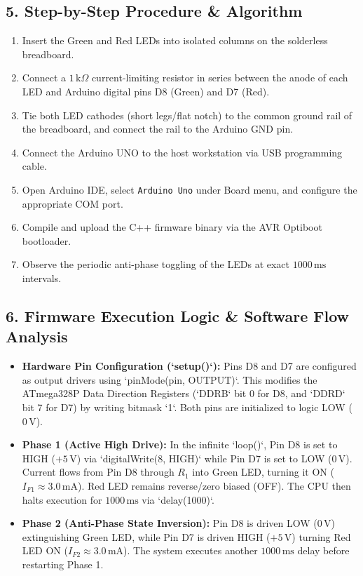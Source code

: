 \documentclass[11pt,a4paper]{article}
\begin{document}
\subsection*{5. Step-by-Step Procedure \& Algorithm}
\begin{enumerate}[noitemsep]
    \item Insert the Green and Red LEDs into isolated columns on the solderless breadboard.
    \item Connect a $1\,\text{k}\Omega$ current-limiting resistor in series between the anode of each LED and Arduino digital pins D8 (Green) and D7 (Red).
    \item Tie both LED cathodes (short legs/flat notch) to the common ground rail of the breadboard, and connect the rail to the Arduino GND pin.
    \item Connect the Arduino UNO to the host workstation via USB programming cable.
    \item Open Arduino IDE, select \texttt{Arduino Uno} under Board menu, and configure the appropriate COM port.
    \item Compile and upload the C++ firmware binary via the AVR Optiboot bootloader.
    \item Observe the periodic anti-phase toggling of the LEDs at exact $1000\,\text{ms}$ intervals.
\end{enumerate}

\subsection*{6. Firmware Execution Logic \& Software Flow Analysis}
\begin{itemize}[leftmargin=*]
    \item \textbf{Hardware Pin Configuration (`setup()`):} Pins D8 and D7 are configured as output drivers using `pinMode(pin, OUTPUT)`. This modifies the ATmega328P Data Direction Registers (`DDRB` bit 0 for D8, and `DDRD` bit 7 for D7) by writing bitmask `1`. Both pins are initialized to logic LOW ($0\,\text{V}$).
    \item \textbf{Phase 1 (Active High Drive):} In the infinite `loop()`, Pin D8 is set to HIGH ($+5\,\text{V}$) via `digitalWrite(8, HIGH)` while Pin D7 is set to LOW ($0\,\text{V}$). Current flows from Pin D8 through $R_1$ into Green LED, turning it ON ($I_{F1} \approx 3.0\,\text{mA}$). Red LED remains reverse/zero biased (OFF). The CPU then halts execution for $1000\,\text{ms}$ via `delay(1000)`.
    \item \textbf{Phase 2 (Anti-Phase State Inversion):} Pin D8 is driven LOW ($0\,\text{V}$) extinguishing Green LED, while Pin D7 is driven HIGH ($+5\,\text{V}$) turning Red LED ON ($I_{F2} \approx 3.0\,\text{mA}$). The system executes another $1000\,\text{ms}$ delay before restarting Phase 1.
\end{itemize}
\end{document}
